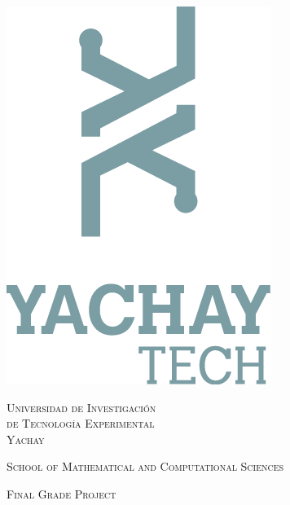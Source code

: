 \documentclass[10pt]{article}
\begin{document}
\begin{center}
\begin{minipage}{0.48\textwidth}
\begin{flushleft}
  \end{flushleft}\end{minipage}
  \begin{minipage}{0.48\textwidth} \begin{flushright}
    \includegraphics[scale = 0.75]{images/yachaytech}
  \end{flushright}\end{minipage}

  \vspace*{-3cm}
  \textsc{\huge Universidad de Investigaci\'on \\
  \vspace{5px} de Tecnolog\'ia Experimental \\
  \vspace{10px} Yachay}\\

  \vspace*{1.5cm}

  \textsc{\Large School of Mathematical and Computational Sciences}\\[2cm]

  \begin{minipage}{0.9\textwidth} 
    \begin{center}
      \textsc{\Large Final Grade Project}
    \end{center}
  \end{minipage}\\[0.5cm]
  

\end{center}
\end{document}
